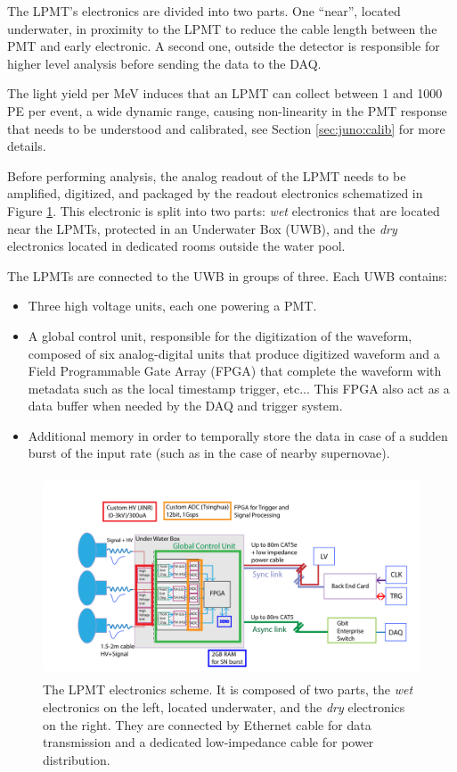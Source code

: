 \documentclass[../main.tex]{subfiles}
\begin{document}
The LPMT's electronics are divided into two parts. One ``near'', located underwater, in proximity to the LPMT to reduce the cable length between the PMT and early electronic. A second one, outside the detector is responsible for higher level analysis before sending the data to the DAQ.

The light yield per MeV induces that an LPMT can collect between 1 and 1000 PE per event, a wide dynamic range,  causing non-linearity in the PMT response that needs to be understood and calibrated, see Section \ref{sec:juno:calib} for more details.

Before performing analysis, the analog readout of the LPMT needs to be amplified, digitized, and packaged by the readout electronics schematized in Figure \ref{fig:juno:lpmt_elec}. This electronic is split into two parts: \textit{wet} electronics that are located near the LPMTs, protected in an Underwater Box (UWB), and the \textit{dry} electronics located in dedicated rooms outside the water pool.

The LPMTs are connected to the UWB in groups of three. Each UWB contains:
\begin{itemize}
  \item Three high voltage units, each one powering a PMT.
  \item A global control unit, responsible for the digitization of the waveform, composed of six analog-digital units that produce digitized waveform and a Field Programmable Gate Array (FPGA) that complete the waveform with metadata such as the local timestamp trigger, etc... This FPGA also act as a data buffer when needed by the DAQ and trigger system.
  \item Additional memory in order to temporally store the data in case of a sudden burst of the input rate (such as in the case of nearby supernovae).
\end{itemize}

\begin{figure}[ht]
  \centering
  \includegraphics[height=6cm]{images/juno/LPMT_readout.png}
  \caption{The LPMT electronics scheme. It is composed of two parts, the \textit{wet} electronics on the left, located underwater, and the \textit{dry} electronics on the right. They are connected by Ethernet cable for data transmission and a dedicated low-impedance cable for power distribution.}
  \label{fig:juno:lpmt_elec}
\end{figure}
\end{document}
